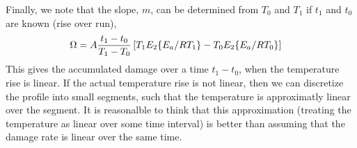 \documentclass{article}
\begin{document}
Finally, we note that the slope, $m$, can be determined from $T_0$ and $T_1$ if $t_1$ and $t_0$ are known (rise over run),
\begin{align}
  \Omega &= A \frac{t_1 - t_0}{T_1 - T_0}              \left[T_1 E_2\qty{E_a/RT_1}              - T_0 E_2\qty{E_a/RT_0}             \right]
\end{align}
This gives the accumulated damage over a time $t_1 - t_0$, when the temperature rise is linear. If the actual
temperature rise is not linear, then we can discretize the profile into small segments, such that
the temperature is approximatly linear over the segment. It is reasonalble to think that this approximation
(treating the temperature as linear over some time interval) is better than assuming that the damage rate
is linear over the same time.




\end{document}
